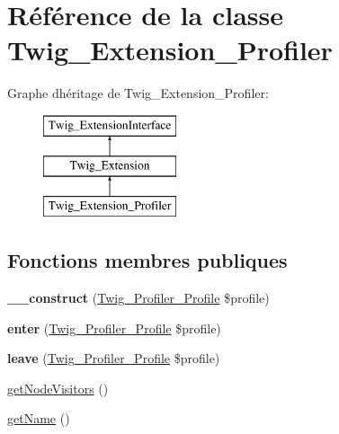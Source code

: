 \hypertarget{class_twig___extension___profiler}{}\section{Référence de la classe Twig\+\_\+\+Extension\+\_\+\+Profiler}
\label{class_twig___extension___profiler}
Graphe d\textquotesingle{}héritage de Twig\+\_\+\+Extension\+\_\+\+Profiler\+:\begin{figure}[H]
\begin{center}
\leavevmode
\includegraphics[height=3.000000cm]{class_twig___extension___profiler}
\end{center}
\end{figure}
\subsection*{Fonctions membres publiques}
\begin{DoxyCompactItemize}
\item 
{\bfseries \+\_\+\+\_\+construct} (\hyperlink{class_twig___profiler___profile}{Twig\+\_\+\+Profiler\+\_\+\+Profile} \$profile)\hypertarget{class_twig___extension___profiler_a3b5dad7ab6b7cb707d4eca5924056097}{}\label{class_twig___extension___profiler_a3b5dad7ab6b7cb707d4eca5924056097}

\item 
{\bfseries enter} (\hyperlink{class_twig___profiler___profile}{Twig\+\_\+\+Profiler\+\_\+\+Profile} \$profile)\hypertarget{class_twig___extension___profiler_a3a42b840e1e27ee2e33dd7c683cbbd16}{}\label{class_twig___extension___profiler_a3a42b840e1e27ee2e33dd7c683cbbd16}

\item 
{\bfseries leave} (\hyperlink{class_twig___profiler___profile}{Twig\+\_\+\+Profiler\+\_\+\+Profile} \$profile)\hypertarget{class_twig___extension___profiler_acd089b6d450b7d15f411f5d66a0a832f}{}\label{class_twig___extension___profiler_acd089b6d450b7d15f411f5d66a0a832f}

\item 
\hyperlink{class_twig___extension___profiler_aec02093179d390d22ae4083f23a1d74a}{get\+Node\+Visitors} ()
\item 
\hyperlink{class_twig___extension___profiler_a3d0963e68bb313b163a73f2803c64600}{get\+Name} ()
\end{DoxyCompactItemize}


